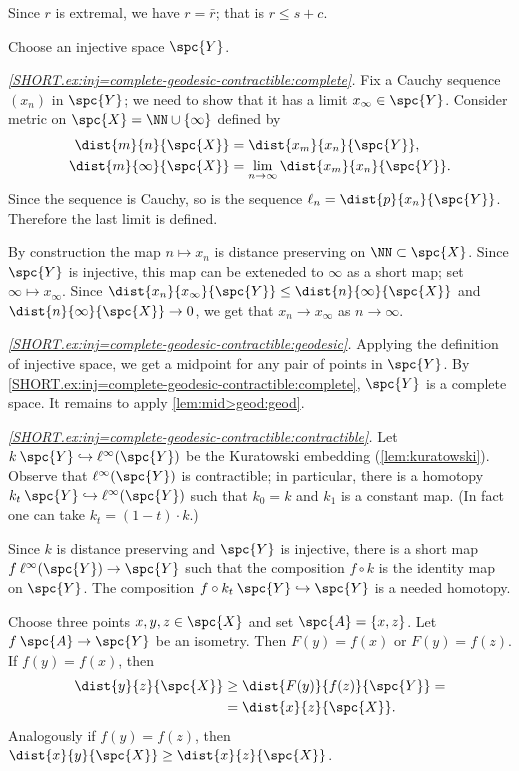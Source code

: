 Since $r$ is extremal, we have $r=\bar r$;
that is $r\le s+c$.

Choose an injective space $\spc{Y}$.

\textit{\ref{SHORT.ex:inj=complete-geodesic-contractible:complete}.}
Fix a Cauchy sequence $(x_n)$ in $\spc{Y}$;
we need to show that it has a limit $x_\infty\in \spc{Y}$.
Consider metric on $\spc{X}=\NN\cup\{\infty\}$ defined by 
\begin{align*}
\dist{m}{n}{\spc{X}}&=\dist{x_m}{x_n}{\spc{Y}},
\\
\dist{m}{\infty}{\spc{X}}&=\lim_{n\to\infty}\dist{x_m}{x_n}{\spc{Y}}.
\end{align*}
Since the sequence is Cauchy, so is the sequence $\ell_n=\dist{p}{x_n}{\spc{Y}}$.
Therefore the last limit is defined.

By construction the map $n\mapsto x_n$ is distance preserving on $\NN\subset \spc{X}$.
Since $\spc{Y}$ is injective, this map can be exteneded to $\infty$ as a short map; set $\infty\mapsto x_\infty$.
Since $\dist{x_n}{x_\infty}{\spc{Y}}\le \dist{n}{\infty}{\spc{X}}$ 
and $\dist{n}{\infty}{\spc{X}}\to 0$, we get that
$x_n\to x_\infty$ as $n\to\infty$.

\textit{\ref{SHORT.ex:inj=complete-geodesic-contractible:geodesic}.}
Applying the definition of injective space, we get a midpoint for any pair of points in $\spc{Y}$.
By \ref{SHORT.ex:inj=complete-geodesic-contractible:complete},
$\spc{Y}$ is a complete space.
It remains to apply \ref{lem:mid>geod:geod}.

\textit{\ref{SHORT.ex:inj=complete-geodesic-contractible:contractible}.}
Let $k\:\spc{Y}\hookrightarrow \ell^\infty(\spc{Y})$ be the Kuratowski embedding (\ref{lem:kuratowski}).
Observe that $\ell^\infty(\spc{Y})$ is contractible;
in particular, there is a homotopy $k_t\:\spc{Y}\hookrightarrow \ell^\infty(\spc{Y})$ such that $k_0=k$ and $k_1$ is a constant map.
(In fact one can take $k_t=(1-t)\cdot k$.)

Since $k$ is distance preserving and $\spc{Y}$ is injective,
there is a short map $f\:\ell^\infty(\spc{Y})\to \spc{Y}$ such that the composition $f\circ k$ is the identity map on $\spc{Y}$.
The composition $f\circ k_t\:\spc{Y}\hookrightarrow \spc{Y}$ is a needed homotopy. 

Choose three points $x,y,z\in\spc{X}$ and set $\spc{A}=\{x,z\}$.
Let $f\:\spc{A}\to \spc{Y}$ be an isometry.
Then $F(y)=f(x)$ or $F(y)=f(z)$.
If  $f(y)=f(x)$, then
\begin{align*}
\dist{y}{z}{\spc{X}}&\ge  \dist{F(y)}{f(z)}{\spc{Y}}=
\\
 &=\dist{x}{z}{\spc{X}}.
\end{align*}
Analogously if $f(y)=f(z)$, then $\dist{x}{y}{\spc{X}}\ge\dist{x}{z}{\spc{X}}$.

